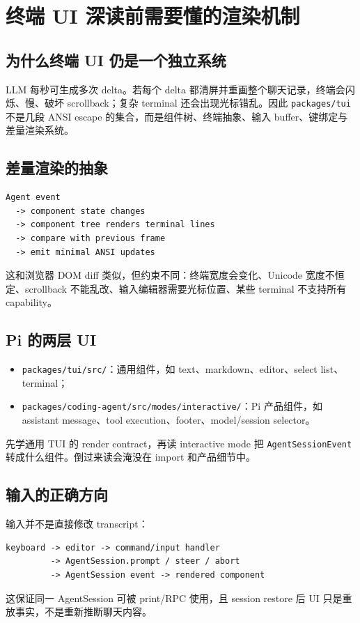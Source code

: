 \documentclass[UTF8,openany,11pt]{ctexbook}
\newcommand{\pathref}[1]{\texttt{#1}}
\begin{document}
\chapter{终端 UI 深读前需要懂的渲染机制}

\section{为什么终端 UI 仍是一个独立系统}
LLM 每秒可生成多次 delta。若每个 delta 都清屏并重画整个聊天记录，终端会闪烁、慢、破坏 scrollback；复杂 terminal 还会出现光标错乱。因此 \pathref{packages/tui} 不是几段 ANSI escape 的集合，而是组件树、终端抽象、输入 buffer、键绑定与差量渲染系统。

\section{差量渲染的抽象}
\begin{Verbatim}[fontsize=\small]
Agent event
  -> component state changes
  -> component tree renders terminal lines
  -> compare with previous frame
  -> emit minimal ANSI updates
\end{Verbatim}
这和浏览器 DOM diff 类似，但约束不同：终端宽度会变化、Unicode 宽度不恒定、scrollback 不能乱改、输入编辑器需要光标位置、某些 terminal 不支持所有 capability。

\section{Pi 的两层 UI}
\begin{itemize}
\item \pathref{packages/tui/src/}：通用组件，如 text、markdown、editor、select list、terminal；
\item \pathref{packages/coding-agent/src/modes/interactive/}：Pi 产品组件，如 assistant message、tool execution、footer、model/session selector。
\end{itemize}
先学通用 TUI 的 render contract，再读 interactive mode 把 \texttt{AgentSessionEvent} 转成什么组件。倒过来读会淹没在 import 和产品细节中。

\section{输入的正确方向}
输入并不是直接修改 transcript：
\begin{Verbatim}[fontsize=\small]
keyboard -> editor -> command/input handler
         -> AgentSession.prompt / steer / abort
         -> AgentSession event -> rendered component
\end{Verbatim}
这保证同一 AgentSession 可被 print/RPC 使用，且 session restore 后 UI 只是重放事实，不是重新推断聊天内容。
\end{document}
